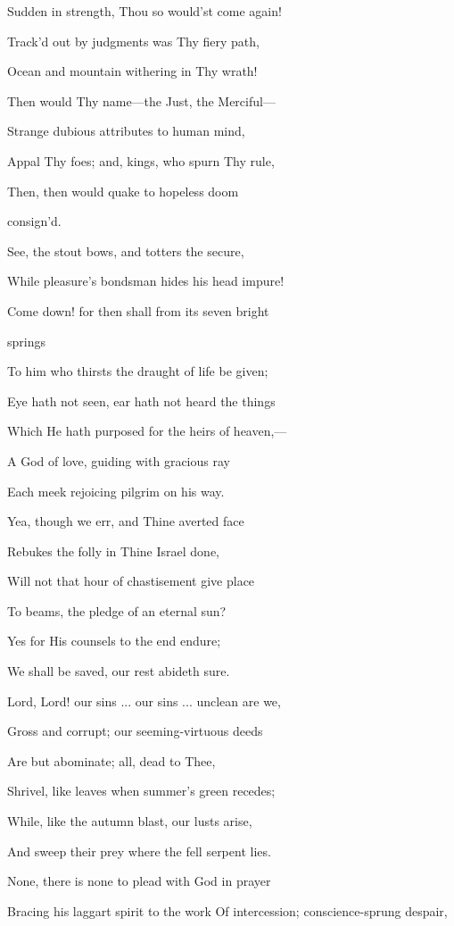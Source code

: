Sudden in strength, Thou so would'st come again!

Track'd out by judgments was Thy fiery path,

Ocean and mountain withering in Thy wrath!

Then would Thy name—the Just, the Merciful—

Strange dubious attributes to human mind,

Appal Thy foes; and, kings, who spurn Thy rule,

Then, then would quake to hopeless doom

consign'd.

See, the stout bows, and totters the secure,

While pleasure's bondsman hides his head impure!

Come down! for then shall from its seven bright

springs

To him who thirsts the draught of life be given;

Eye hath not seen, ear hath not heard the things

Which He hath purposed for the heirs of heaven,—

A God of love, guiding with gracious ray

Each meek rejoicing pilgrim on his way.

Yea, though we err, and Thine averted face

Rebukes the folly in Thine Israel done,

Will not that hour of chastisement give place

To beams, the pledge of an eternal sun?

Yes for His counsels to the end endure;

We shall be saved, our rest abideth sure.

Lord, Lord! our sins ... our sins ... unclean are we,

Gross and corrupt; our seeming-virtuous deeds

Are but abominate; all, dead to Thee,

Shrivel, like leaves when summer's green recedes;

While, like the autumn blast, our lusts arise,

And sweep their prey where the fell serpent lies.

None, there is none to plead with God in prayer

Bracing his laggart spirit to the work Of intercession; conscience-sprung despair,

